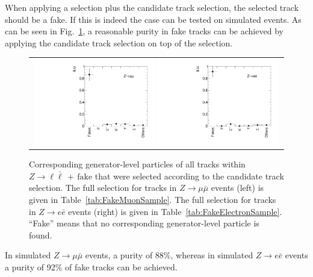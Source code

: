 When applying a \Zlep selection plus the candidate track selection, the selected track should be a fake.
If this is indeed the case can be tested on simulated \Zlep events.
As can be seen in Fig.~\ref{fig:BkgComposition}, a reasonable purity in fake tracks can be achieved by applying the candidate track selection on top of the \Zlep selection.
\begin{figure}[!b]
  \centering 
  \begin{tabular}{c}
    \includegraphics[width=0.49\textwidth]{figures/analysis/Background/ParticleCompositionInFakeCS_Mu.pdf}
    \includegraphics[width=0.49\textwidth]{figures/analysis/Background/ParticleCompositionInFakeCS_Ele.pdf}
  \end{tabular}
  \caption{Corresponding generator-level particles of all tracks within $Z\rightarrow \ell \bar{\ell}\,+\,\text{fake}$ that were selected according to the candidate track selection. 
           The full selection for tracks in $Z\rightarrow \mu \bar{\mu}$ events (left) is given in Table~\ref{tab:FakeMuonSample}.
           The full selection for tracks in $Z\rightarrow e \bar{e}$ events (right) is given in Table~\ref{tab:FakeElectronSample}.
           ``Fake'' means that no corresponding generator-level particle is found. }
  \label{fig:BkgComposition}
\vspace{50pt}
\end{figure}
In simulated $Z\rightarrow\mu\bar{\mu}$ events, a purity of 88\%, whereas in simulated $Z\rightarrow e\bar{e}$ events a purity of 92\% of fake tracks can be achieved.


